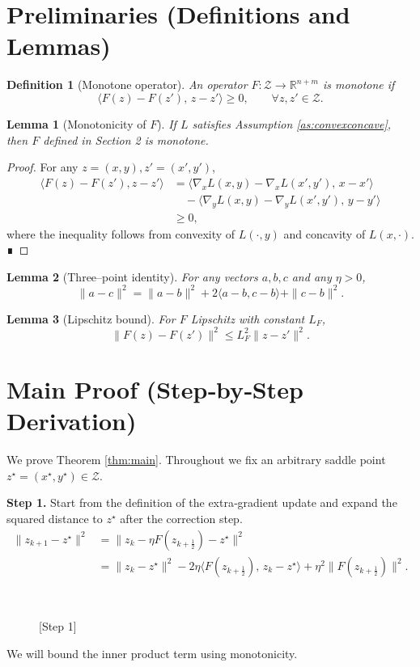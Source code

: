 \documentclass{article}
\newtheorem{lemma}{Lemma}
\newtheorem{definition}{Definition}
\newcommand{\R}{\mathbb{R}}
\begin{document}
\newpage
\section*{Preliminaries (Definitions and Lemmas)}
\begin{definition}[Monotone operator]
An operator $F:\mathcal{Z}\to\R^{n+m}$ is monotone if
\[
\langle F(z)-F(z'),\,z-z'\rangle\ge 0,\qquad\forall z,z'\in\mathcal{Z}.
\]
\end{definition}
\begin{lemma}[Monotonicity of $F$]\label{lem:mono}
If $L$ satisfies Assumption \ref{as:convexconcave}, then $F$ defined in Section 2 is monotone.
\end{lemma}
\begin{proof}
For any $z=(x,y),z'=(x',y')$,
\[
\begin{aligned}
\langle F(z)-F(z'),z-z'\rangle
&=\langle\nabla_{x}L(x,y)-\nabla_{x}L(x',y'),\,x-x'\rangle\\
&\quad -\langle\nabla_{y}L(x,y)-\nabla_{y}L(x',y'),\,y-y'\rangle\\
&\ge 0,
\end{aligned}
\]
where the inequality follows from convexity of $L(\cdot ,y)$ and concavity of $L(x,\cdot)$. ∎
\end{proof}
\begin{lemma}[Three–point identity]\label{lem:three}
For any vectors $a,b,c$ and any $\eta>0$,
\[
\|a-c\|^{2}= \|a-b\|^{2}+2\langle a-b,c-b\rangle+\|c-b\|^{2}.
\tag{3}
\]
\end{lemma}
\begin{lemma}[Lipschitz bound]\label{lem:lipschitz}
For $F$ Lipschitz with constant $L_{F}$,
\[
\|F(z)-F(z')\|^{2}\le L_{F}^{2}\|z-z'\|^{2}.
\tag{4}
\]
\end{lemma}

\section*{Main Proof (Step‑by‑Step Derivation)}
We prove Theorem \ref{thm:main}.  Throughout we fix an arbitrary saddle point $z^{\star}=(x^{\star},y^{\star})\in\mathcal{Z}$.

\bigskip
\noindent\textbf{Step 1.}  Start from the definition of the extra‑gradient update and expand the squared distance to $z^{\star}$ after the correction step.
\begin{align}
\|z_{k+1}-z^{\star}\|^{2}
&= \big\|z_{k}-\eta F(z_{k+\frac12})-z^{\star}\big\|^{2} \nonumber\\
&= \|z_{k}-z^{\star}\|^{2}
   -2\eta\langle F(z_{k+\frac12}),\,z_{k}-z^{\star}\rangle
   +\eta^{2}\|F(z_{k+\frac12})\|^{2}. \tag{5}
\end{align}
\begin{description}
\item[\,] \hfill[Step 1]
\end{description}
We will bound the inner product term using monotonicity.
\end{document}
